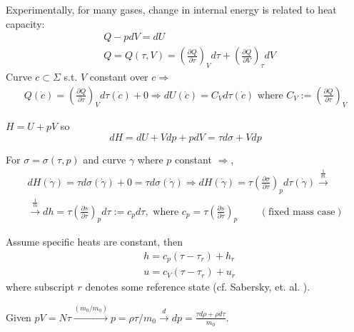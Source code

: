 \documentclass[twoside,landscape,10pt]{amsart}
\theoremstyle{plain}
\theoremstyle{definition}
\theoremstyle{remark}
\theoremstyle{remark}
\begin{document}
\begin{multicols*}{2}
Experimentally, for many gases, change in internal energy is related to heat capacity:
\[
\begin{aligned} 
& Q - pdV = dU \\ 
& Q = Q(\tau, V) =  \left( \frac{ \partial Q}{ \partial \tau} \right)_V d\tau + \left( \frac{ \partial Q}{ \partial V} \right)_{\tau} dV 
\end{aligned} 
\]
Curve $c \subset \Sigma$ s.t. $V$ constant over $c \Longrightarrow$ 
\[
\begin{gathered}
Q(\dot{c}) =  \left( \frac{ \partial Q}{ \partial \tau } \right)_V d\tau (\dot{c}) + 0 \Longrightarrow dU(\dot{c}) = C_V d\tau (\dot{c}) \text{ where } C_V := \left( \frac{ \partial Q}{ \partial \tau} \right)_V
\end{gathered}
\]

$H = U + pV$ so 
\[
dH = dU + Vdp + pdV = \tau d\sigma +Vdp
\]

For $\sigma = \sigma(\tau, p)$ and curve $\gamma$ where $p$ constant $\Longrightarrow $,
\[
\begin{gathered}
	dH(\dot{\gamma}) = \tau d\sigma(\dot{\gamma}) + 0 = \tau d\sigma(\dot{\gamma}) \Longrightarrow dH(\dot{\gamma}) = \tau \left( \frac{ \partial \sigma}{ \partial \tau} \right)_p d\tau(\dot{\gamma} ) \xrightarrow{\frac{1}{m} } \\ 
	\xrightarrow{ \frac{1}{m}} dh = \tau \left( \frac{ \partial s }{ \partial \tau} \right)_p d\tau := c_p d\tau, \text{ where } c_p = \tau \left( \frac{ \partial s}{ \partial \tau} \right)_p \qquad \, (\text{fixed mass case}) 
\end{gathered}
\]

Assume specific heats are constant, then 
\[
\begin{aligned}
& h = c_p (\tau - \tau_r) + h_r \\ 
& u = c_V (\tau - \tau_r) + u_r
\end{aligned}
\]
where subscript $r$ denotes some reference state (cf. Sabersky, et. al. \cite{SAHG1998}).

Given $pV = N\tau \xrightarrow{ (m_0 / m_0) } p = \rho \tau / m_0 \xrightarrow{d} dp = \frac{ \tau d\rho + \rho d\tau }{m_0} $.


\end{multicols*}
\end{document}
